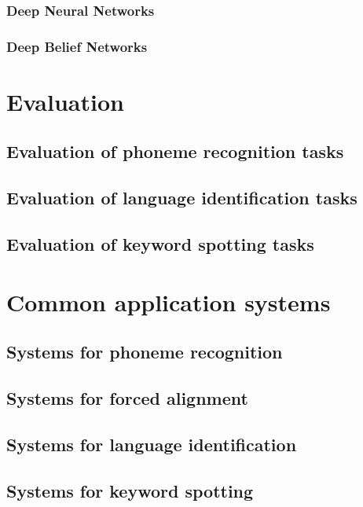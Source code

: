\subsubsection{Deep Neural Networks}
\subsubsection{Deep Belief Networks}
\section{Evaluation}
\subsection{Evaluation of phoneme recognition tasks}
\subsection{Evaluation of language identification tasks}
\subsection{Evaluation of keyword spotting tasks}
\section{Common application systems}
\subsection{Systems for phoneme recognition}
\subsection{Systems for forced alignment}
\subsection{Systems for language identification}
\subsection{Systems for keyword spotting}




